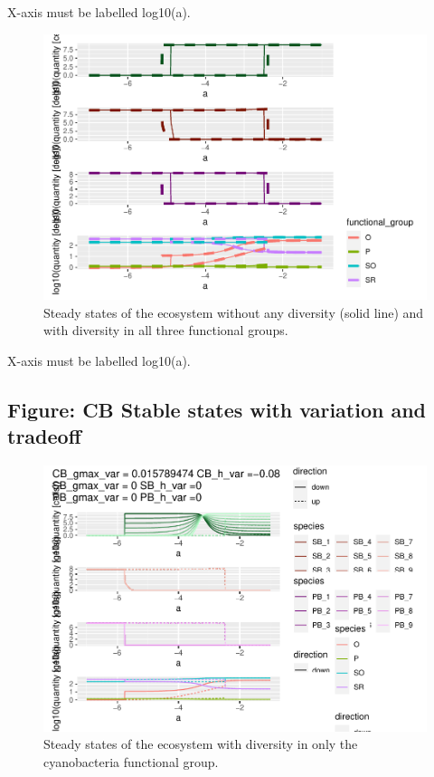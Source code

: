 \documentclass{article}
\begin{document}
X-axis must be labelled log10(a).

\begin{figure}

{\centering \includegraphics[width=1\linewidth]{article_files/figure-latex/ss_var2-1} 

}

\caption{Steady states of the ecosystem without any diversity (solid line) and with diversity in all three functional groups.}\label{fig:ss_var2}
\end{figure}

X-axis must be labelled log10(a).

\hypertarget{figure-cb-stable-states-with-variation-and-tradeoff}{%
\subsection{Figure: CB Stable states with variation and
tradeoff}\label{figure-cb-stable-states-with-variation-and-tradeoff}}

\begin{figure}

{\centering \includegraphics[width=1\linewidth]{article_files/figure-latex/CB_var1-1} 

}

\caption{Steady states of the ecosystem with diversity in only the cyanobacteria functional group.}\label{fig:CB_var1}
\end{figure}
\end{document}
